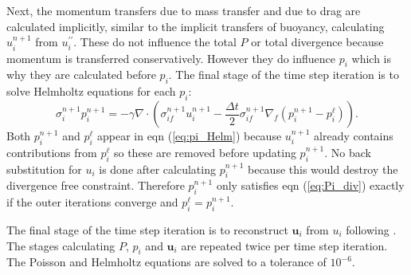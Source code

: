 \documentclass[draft]{agujournal2019}
\begin{document}
Next, the momentum transfers due to mass transfer and due to drag
are calculated implicitly, similar to the implicit transfers of buoyancy,
calculating $u_{i}^{n+1}$ from $u_{i}^{\prime\prime}$. These do
not influence the total $P$ or total divergence because momentum
is transferred conservatively. However they do influence $p_{i}$
which is why they are calculated before $p_{i}$. The final stage
of the time step iteration is to solve Helmholtz equations for each
$p_{i}$:
\begin{equation}
\sigma_{i}^{n+1}p_{i}^{n+1}=-\gamma\nabla\cdot\left(\sigma_{if}^{n+1}u_{i}^{n+1}-\frac{\Delta t}{2}\sigma_{if}^{n+1}\nabla_{f}\left(p_{i}^{n+1}-p_{i}^{\ell}\right)\right).\label{eq:pi_Helm}
\end{equation}
Both $p_{i}^{n+1}$ and $p_{i}^{\ell}$ appear in eqn (\ref{eq:pi_Helm})
because $u_{i}^{n+1}$ already contains contributions from $p_{i}^{\ell}$
so these are removed before updating $p_{i}^{n+1}$. No back substitution
for $u_{i}$ is done after calculating $p_{i}^{n+1}$ because this
would destroy the divergence free constraint. Therefore $p_{i}^{n+1}$
only satisfies eqn (\ref{eq:Pi_div}) exactly if the outer iterations
converge and $p_{i}^{\ell}=p_{i}^{n+1}$. 

The final stage of the time step iteration is to reconstruct $\mathbf{u}_{i}$
from $u_{i}$ following . The stages calculating $P$,
$p_{i}$ and $\mathbf{u}_{i}$ are repeated twice per time step iteration.
The Poisson and Helmholtz equations are solved to a tolerance of $10^{-6}$.

\subsection{\label{sec:cAveraging} }

\end{document}
